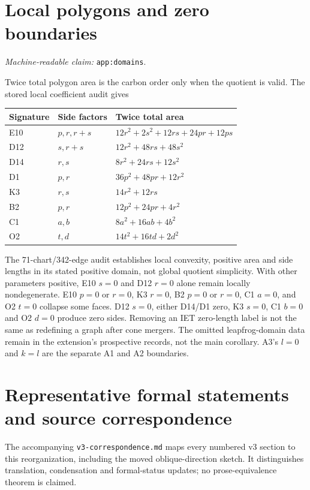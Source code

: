 \documentclass[11pt]{amsart}
\newcommand{\record}[1]{\nolinkurl{#1}}
\newcommand{\claimid}[1]{\par\nopagebreak\noindent\textit{Machine-readable claim:} \record{#1}.\par}
\theoremstyle{definition}\newtheorem{definition}{Definition}
\begin{document}
\section{Local polygons and zero boundaries}\label{app:domains}
\claimid{app:domains}
Twice total polygon area is the carbon order only when the quotient
is valid. The stored local coefficient audit gives
\begin{center}\small
\begin{tabular}{lll}\toprule
Signature & Side factors & Twice total area\\\midrule
E10 & $p,r,r+s$ & $12r^2+2s^2+12rs+24pr+12ps$\\
D12 & $s,r+s$ & $12r^2+48rs+48s^2$\\
D14 & $r,s$ & $8r^2+24rs+12s^2$\\
D1 & $p,r$ & $36p^2+48pr+12r^2$\\
K3 & $r,s$ & $14r^2+12rs$\\
B2 & $p,r$ & $12p^2+24pr+4r^2$\\
C1 & $a,b$ & $8a^2+16ab+4b^2$\\
O2 & $t,d$ & $14t^2+16td+2d^2$\\\bottomrule
\end{tabular}
\end{center}
The 71-chart/342-edge audit establishes local convexity, positive area
and side lengths in its stated positive domain, not global quotient
simplicity. With other parameters positive, E10 $s=0$ and D12 $r=0$
alone remain locally nondegenerate. E10 $p=0$ or $r=0$, K3 $r=0$,
B2 $p=0$ or $r=0$, C1 $a=0$, and O2 $t=0$ collapse some faces.
D12 $s=0$, either D14/D1 zero, K3 $s=0$, C1 $b=0$ and O2 $d=0$
produce zero sides. Removing an IET zero-length label is not the same
as redefining a graph after cone mergers. The omitted leapfrog-domain
data remain in the extension's prospective records, not the main
corollary. A3's $l=0$ and $k=l$ are the separate A1 and A2 boundaries.

\section{Representative formal statements and source correspondence}\label{app:correspondence}
The accompanying \record{v3-correspondence.md} maps every numbered v3
section to this reorganization, including the moved oblique-direction
sketch. It distinguishes translation, condensation and formal-status
updates; no prose-equivalence theorem is claimed.
\end{document}
